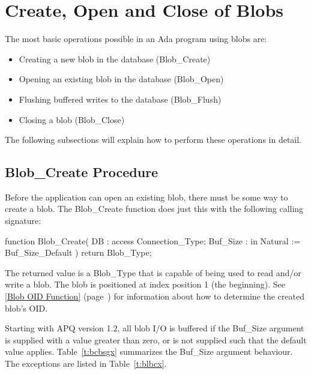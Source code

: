 \documentclass[english,letterpaper]{book}
\newcommand\Ref[1]{\textsection\ref{#1} (page~\pageref{#1})}
\begin{document}
\section{Create, Open and Close of Blobs}

The most basic operations possible in an Ada program using blobs are:

\begin{itemize}
   \item Creating a new blob in the database (Blob\_Create)
   \item Opening an existing blob in the database (Blob\_Open)
   \item Flushing buffered writes to the database (Blob\_Flush)
   \item Closing a blob (Blob\_Close)
\end{itemize}

The following subsections will explain how to perform these operations
in detail.


\subsection{Blob\_Create Procedure}

Before the application can open an existing blob,
there must be some way to create a blob. The
Blob\_Create function does just this with the following calling signature:%

\begin{Code}
function Blob_Create(
   DB :       access Connection_Type;
   Buf_Size : in     Natural := Buf_Size_Default
) return Blob_Type;
\end{Code}

The returned value is a Blob\_Type that is capable of being used to
read and/or write a blob. The blob is positioned at index position
1 (the beginning). See \Ref{Blob OID Function} for information
about how to determine the created blob's OID. 

Starting with APQ version 1.2, all blob I/O is buffered if the Buf\_Size
argument is supplied with a value greater than zero, or is not supplied
such that the default value applies. Table~\ref{t:bcbsgx} summarizes
the Buf\_Size argument behaviour. The exceptions
are listed in Table~\ref{t:blbcx}.
\end{document}
